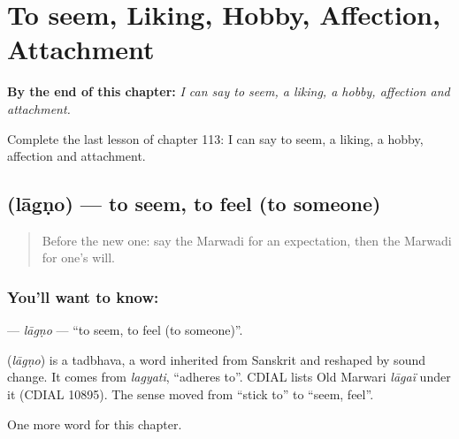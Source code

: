 
\chapter{To seem, Liking, Hobby, Affection, Attachment}
\label{ch:mw-to-seem-liking-hobby-affection-attachment}

\begin{chapteropening}
\textbf{By the end of this chapter:} \emph{I can say to seem, a liking, a hobby, affection and attachment.}

Complete the last lesson of chapter 113: I can say to seem, a liking, a hobby, affection and attachment.
\end{chapteropening}

\section[\texorpdfstring{\mw{लागणो} (lāgṇo)}{लागणो (lāgṇo)}]{ (lāgṇo) — to seem, to feel (to someone)}

\label{lesson:MW-C113-lagno}



\begin{quote}
Before the new one: say the Marwadi for an expectation, then the Marwadi for one's will.
\end{quote}

\subsection*{You'll want to know: }
\textbf{} — \emph{lāgṇo} — \textquotedblleft{}to seem, to feel (to someone)\textquotedblright{}.

\begin{cousinweb}
\textbf{} (\emph{lāgṇo}) is a tadbhava, a word inherited from Sanskrit and reshaped by sound change. It comes from \emph{lagyati}, \textquotedblleft{}adheres to\textquotedblright{}. CDIAL lists Old Marwari \emph{lāgaï} under it (CDIAL 10895). The sense moved from \textquotedblleft{}stick to\textquotedblright{} to \textquotedblleft{}seem, feel\textquotedblright{}.
\end{cousinweb}

\begin{grammarlens}[title={What you've built}]
One more word for this chapter.
\end{grammarlens}

